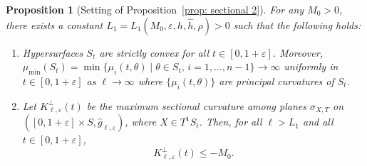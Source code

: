 \documentclass[JEP,XML,SOM,Unicode,NoFloatCountersInSection]{cedram}
\let\sep\mid
\newtheorem{proposition}[theorem]{Proposition}
\theoremstyle{definition}
\let\eps\varepsilon
\renewcommand{\>}{{\rangle}}
\newcommand{\<}{{\langle}}
\begin{document}
\begin{proposition}[Setting of Proposition~\ref{prop: sectional 2}]\label{prop: collar 3}
For any $M_0>0$, there exists a con\-stant $L_1=L_1(M_0, \eps, h, \hat h, \rho)>0$ such that the following holds:
\begin{enumerate}
\item\label{convexity 2} Hypersurfaces $S_t$ are strictly convex for all $t\in[0,1+\eps]$. Moreover, $\mu_{\min}(S_t)=\min\{\mu_{i}(t,\theta)\sep\theta\in S_t,\, i=1,\ldots,n-1\}\to\infty$ uniformly in $t\in[0,1+\eps]$ as $\ell\to\infty$ where $\{\mu_{i}(t,\theta)\}$ are principal curvatures of $S_t$.
\item\label{normal 2} Let $K^\perp_{\ell,\eps}(t)$ be the maximum sectional curvature among planes $\sigma_{X,T}$ on \hbox{$([0,1+\eps]\times S, \hat g_{\ell,\eps})$}, where $X\in T^1S_t$. Then, for all $\ell>L_1$ and all $t\in[0,1+\eps]$,
\begin{equation*}
K^\perp_{\ell,\eps}(t)\leq -M_0.
\end{equation*}

\end{enumerate}
\end{proposition}
\end{document}
